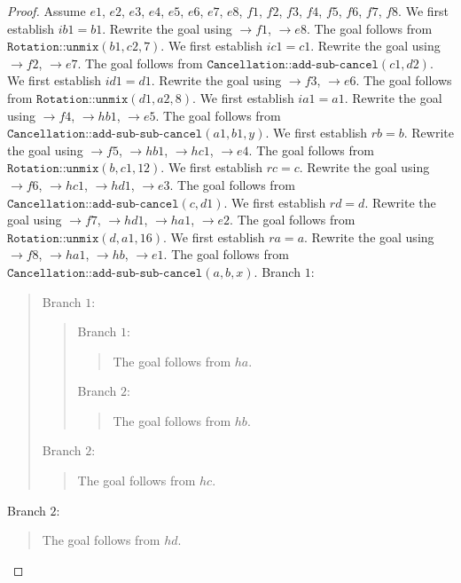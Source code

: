 \documentclass[11pt]{article}
\theoremstyle{definition}
\begin{document}
\begin{proof}
Assume \(e1\), \(e2\), \(e3\), \(e4\), \(e5\), \(e6\), \(e7\), \(e8\), \(f1\), \(f2\), \(f3\), \(f4\), \(f5\), \(f6\), \(f7\), \(f8\).
We first establish \(ib1 = b1\).
Rewrite the goal using \(\rightarrow f1\), \(\rightarrow e8\).
The goal follows from \(\texttt{Rotation::unmix}(b1, c2, 7)\).
We first establish \(ic1 = c1\).
Rewrite the goal using \(\rightarrow f2\), \(\rightarrow e7\).
The goal follows from \(\texttt{Cancellation::add-sub-cancel}(c1, d2)\).
We first establish \(id1 = d1\).
Rewrite the goal using \(\rightarrow f3\), \(\rightarrow e6\).
The goal follows from \(\texttt{Rotation::unmix}(d1, a2, 8)\).
We first establish \(ia1 = a1\).
Rewrite the goal using \(\rightarrow f4\), \(\rightarrow hb1\), \(\rightarrow e5\).
The goal follows from \(\texttt{Cancellation::add-sub-sub-cancel}(a1, b1, y)\).
We first establish \(rb = b\).
Rewrite the goal using \(\rightarrow f5\), \(\rightarrow hb1\), \(\rightarrow hc1\), \(\rightarrow e4\).
The goal follows from \(\texttt{Rotation::unmix}(b, c1, 12)\).
We first establish \(rc = c\).
Rewrite the goal using \(\rightarrow f6\), \(\rightarrow hc1\), \(\rightarrow hd1\), \(\rightarrow e3\).
The goal follows from \(\texttt{Cancellation::add-sub-cancel}(c, d1)\).
We first establish \(rd = d\).
Rewrite the goal using \(\rightarrow f7\), \(\rightarrow hd1\), \(\rightarrow ha1\), \(\rightarrow e2\).
The goal follows from \(\texttt{Rotation::unmix}(d, a1, 16)\).
We first establish \(ra = a\).
Rewrite the goal using \(\rightarrow f8\), \(\rightarrow ha1\), \(\rightarrow hb\), \(\rightarrow e1\).
The goal follows from \(\texttt{Cancellation::add-sub-sub-cancel}(a, b, x)\).
Branch \(1\):
\begin{quote}
Branch \(1\):
\begin{quote}
Branch \(1\):
\begin{quote}
The goal follows from \(ha\).
\end{quote}
Branch \(2\):
\begin{quote}
The goal follows from \(hb\).
\end{quote}
\end{quote}
Branch \(2\):
\begin{quote}
The goal follows from \(hc\).
\end{quote}
\end{quote}
Branch \(2\):
\begin{quote}
The goal follows from \(hd\).
\end{quote}
\end{proof}
\end{document}
